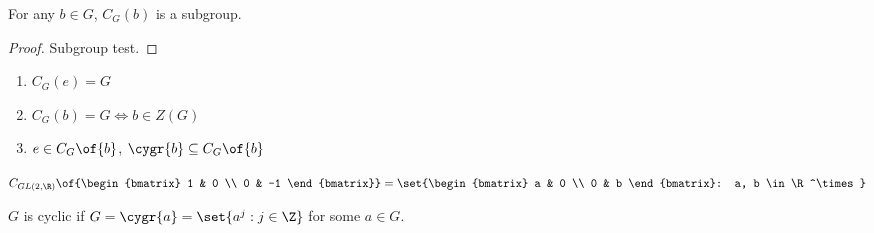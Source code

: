 \begin{theorem}
    For any $b \in G$, $C_G(b)$ is a subgroup.
\end{theorem}
\begin{proof}
    Subgroup test.
\end{proof}

\begin{remark}
    \begin{enumerate}
        \item $C_G(e) = G$
        \item $C_G(b) = G \iff b \in Z(G)$
        \item $e \in C_G\of{b}$, $\cygr{b} \subseteq C_G\of{b}$
    \end{enumerate}
\end{remark}

\begin{example}[a centralizer]
    $C_{GL(2, \R)}\of{\begin{bmatrix} 1 & 0 \\ 0 & -1 \end{bmatrix}} = \set{\begin{bmatrix} a & 0 \\ 0 & b \end{bmatrix}: a, b \in \R^\times}$
\end{example}

\begin{recall}
    $G$ is cyclic if $G = \cygr{a} = \set{a^j: j \in \Z}$ for some $a \in G$.
\end{recall}

